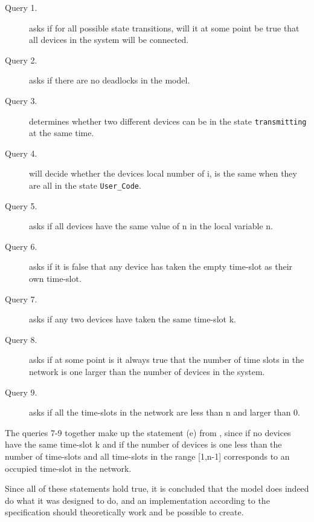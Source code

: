 \begin{description}
	\item [Query 1.] asks if for all possible state transitions, will it at some point be true that all devices in the system will be connected.
	\item [Query 2.] asks if there are no deadlocks in the model.
	\item [Query 3.] determines whether two different devices can be in the state \texttt{transmitting} at the same time.
	\item [Query 4.] will decide whether the devices local number of i, is the same when they are all in the state \texttt{User\_Code}.
	\item [Query 5.] asks if all devices have the same value of n in the local variable n.
	\item [Query 6.] asks if it is false that any device has taken the empty time-slot as their own time-slot.
	\item [Query 7.] asks if any two devices have taken the same time-slot k.
	\item [Query 8.] asks if at some point is it always true that the number of time slots in the network is one larger than the number of devices in the system.
	\item [Query 9.] asks if all the time-slots in the network are less than n and larger than 0.
\end{description}

The queries 7-9 together make up the statement (e) from , since if no devices have the same time-slot k and if the number of devices is one less than the number of time-slots and all time-slots in the range [1,n-1] corresponds to an occupied time-slot in the network.

Since all of these statements hold true, it is concluded that the model does indeed do what it was designed to do, and an implementation according to the specification should theoretically work and be possible to create.
